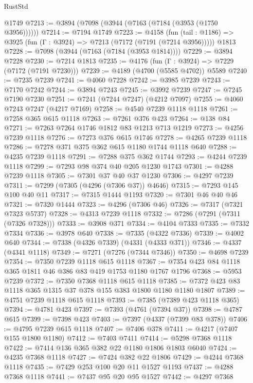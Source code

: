 \begin{lexlean}{RustStd}
\begin{coremodule}
    @1749
@7213 := @3894 (@7098 (@3944 (@7163 (@7184 (@3953 (@1750 @3956))))))
@7214 := @7194 @1749
@7223 := @4158
    (fun (tail : @1186) => @3925 (fun (Γ : @3924) => @7213 (@7172 (@7191 (@7214 @3956)))))
    @1813
@7228 := @7098 (@3944 (@7163 (@7184 (@3953 @1814))))
@7229 := @3894 @7228
@7230 := @7214 @1813
@7235 := @4176 (fun (Γ : @3924) => @7229 (@7172 (@7191 @7230)))
@7239 := @4189 (@4700 (@5585 @4702)) @5589
@7240 := @7235 @7239
@7241 := @4060 @7228
@7242 := @3985 @7239
@7243 := @7170 @7242
@7244 := @3894 @7243
@7245 := @3992 @7239
@7247 := @7245 @7190 @7230
@7251 := @7241 (@7244 @7247) (@4212 @7097)
@7255 := @4060 @7243 @7247 (@4217 @7169)
@7258 := @4540 @7239 @1118 @1118
@7261 := @7258 @365 @615 @1118
@7263 := @7261 @376 @423
@7264 := @138 @84
@7271 := @7263 @7264 @1746 @1812 @83 @1213 @713 @1219
@7273 := @4256 @7239 @1118
@7276 := @7273 @376 @615 @1746
@7278 := @4265 @7239 @1118
@7286 := @7278 @371 @375 @362 @615 @1180 @1744 @1118 @640
@7288 := @4235 @7239 @1118
@7291 := @7288 @375 @362 @1744
@7293 := @4244 @7239 @1118
@7299 := @7293 @98 @374 @40 @205 @1230 @1743
@7301 := @4288 @7239 @1118
@7305 := @7301 @37 @40 @37 @1230
@7306 := @4297 @7239
@7311 := @7299 (@7305 (@4296 (@7306 @37)) @4646)
@7315 := @7293 @145 @100 @40 @11
@7317 := @7315 @1444 @1193
@7320 := @7301 @46 @40 @46
@7321 := @7320 @1444
@7323 := @4296 (@7306 @46)
@7326 := @7317 (@7321 @7323 @5737)
@7328 := @4313 @7239 @1118
@7332 := @7286 (@7291 (@7311 (@7326 @7328)))
@7333 := @3908 @371
@7334 := @4104 @7333
@7335 := @7332 @7334
@7336 := @3978 @640
@7338 := @7335 (@4322 @7336)
@7339 := @4002 @640
@7344 := @7338 (@4326 @7339) (@4331 (@4333 @371))
@7346 := @4337 (@4341 @1118)
@7349 := @7271 (@7276 (@7344 @7346))
@7350 := @4698 @7239
@7354 := @7350 @7239 @1118 @615 @1118
@7367 := @7354 @423 @84 @1118 @365 @1811 @46 @386 @83 @419 @1753 @1180 @1767 @1796
@7368 := @5953 @7239
@7372 := @7350 @7368 @1118 @615 @1118
@7385 := @7372 @423 @83 @1118 @365 @1315 @37 @378 @155 @383 @1800 @1180 @1180 @1807
@7389 := @4751 @7239 @1118 @615 @1118
@7393 := @7385 (@7389 @423 @1118 @365)
@7394 := @4781 @423
@7397 := @7393 (@4761 (@7394 @37))
@7398 := @4787 @615
@7399 := @7398 @423
@7403 := @7397 (@4337 (@7399 @83 @378))
@7406 := @4795 @7239 @615 @1118
@7407 := @7406 @378
@7411 := @4217 (@7407 @155 @1800 @1180)
@7412 := @7403 @7411
@7414 := @5298 @7368 @1118
@7422 := @7414 @136 @365 @382 @22 @1180 @1806 @1803 @6040
@7424 := @4235 @7368 @1118
@7427 := @7424 @382 @22 @1806
@7429 := @4244 @7368 @1118
@7435 := @7429 @253 @100 @20 @11 @1527 @1193
@7437 := @4288 @7368 @1118
@7441 := @7437 @95 @20 @95 @1527
@7442 := @4297 @7368

\end{coremodule}
\end{lexlean}
